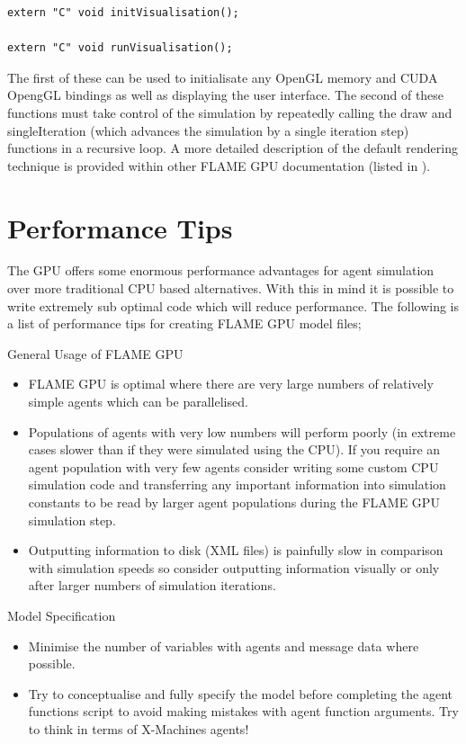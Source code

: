 \documentclass[11pt, a4paper, onecolumn, oneside]{report}
\begin{document}
\begin{verbatim}
extern "C" void initVisualisation();

extern "C" void runVisualisation();
\end{verbatim}

The first of these can be used to initialisate any OpenGL memory and CUDA OpengGL bindings as well as displaying the user interface.
The second of these functions must take control of the simulation by repeatedly calling the draw and singleIteration (which advances the simulation by a single iteration step) functions in a recursive loop.
A more detailed description of the default rendering technique is provided within other FLAME GPU documentation (listed in ).

\section{Performance Tips}
\label{sec:47}


The GPU offers some enormous performance advantages for agent simulation over more traditional CPU based alternatives.
With this in mind it is possible to write extremely sub optimal code which will reduce performance.
The following is a list of performance tips for creating FLAME GPU model files;

General Usage of FLAME GPU
\begin{itemize}
    \item FLAME GPU is optimal where there are very large numbers of relatively simple agents which can be parallelised.
    \item Populations of agents with very low numbers will perform poorly (in extreme cases slower than if they were simulated using the CPU).
        If you require an agent population with very few agents consider writing some custom CPU simulation code and transferring any important information into simulation constants to be read by larger agent populations during the FLAME GPU simulation step.
    \item Outputting information to disk (XML files) is painfully slow in comparison with simulation speeds so consider outputting information visually or only after larger numbers of simulation iterations.
\end{itemize}

Model Specification

\begin{itemize}
    \item Minimise the number of variables with agents and message data where possible.
    \item Try to conceptualise and fully specify the model before completing the agent functions script to avoid making mistakes with agent function arguments.
        Try to think in terms of X-Machines agents!
\end{itemize}
\end{document}
